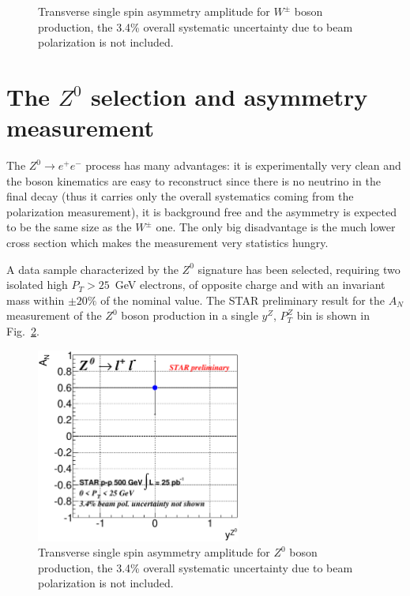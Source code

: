 \documentclass[12pt]{article}
\begin{document}
\begin{figure}[htbp]
  \caption{Transverse single spin asymmetry amplitude for $W^{\pm}$ boson production, the 3.4\% overall systematic uncertainty due to beam polarization is not included.}
  \label{Fig:W-An}
\end{figure}

\section{The $Z^{0}$ selection and asymmetry measurement}
The $Z^{0}\rightarrow e^{+}e^{-}$ process has many advantages: it is experimentally very clean and the boson kinematics are easy to reconstruct since there is no neutrino in the final decay (thus it carries only the overall systematics coming from the polarization measurement), it is background free and the asymmetry is expected to be the same size as the $W^{\pm}$ one. The only big disadvantage is the much lower cross section which makes the measurement very statistics hungry. 

A data sample characterized by the $Z^{0}$ signature has been selected, requiring two isolated high $P_{T} > 25$~GeV electrons, of opposite charge and with an invariant mass within $\pm 20 \%$ of the nominal value.
The STAR preliminary result for the $A_{N}$ measurement of the $Z^{0}$ boson production in a single $y^{Z}$, $P_{T}^{Z}$ bin is shown in Fig.~\ref{Fig:Z-An}. 

\begin{figure}[htbp]
  \centering
  \includegraphics[width=0.6\textwidth]{images/asymmetries/hd_Z0_AsymAmpSqrtVsRap}
  \caption{Transverse single spin asymmetry amplitude for $Z^{0}$ boson production, the 3.4\% overall systematic uncertainty due to beam polarization is not included.}
  \label{Fig:Z-An}
\end{figure}
\end{document}
